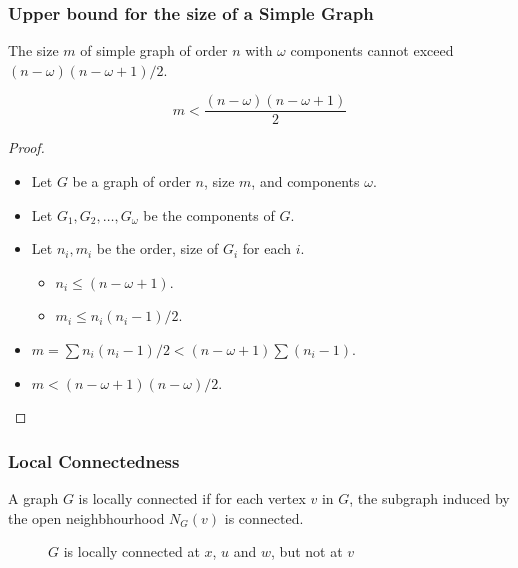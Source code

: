 \documentclass{beamer}
\begin{document}
\begin{frame}
\frametitle{Upper bound for the size of a Simple Graph}%
\begin{theorem}
	The size $m$ of simple graph of order $n$ with $\omega$ components cannot exceed $(n-\omega)(n-\omega+1)/2$.
\end{theorem}
	$$ m < \frac{(n-\omega)(n-\omega+1)}{2}$$
\begin{proof}
\begin{itemize}
	\item Let $G$ be a graph of order $n$, size $m$, and components $\omega$.
	\item Let $G_1,G_2,\dots,G_\omega$ be the components of $G$.
	\item Let $n_i,m_i$ be the order, size of $G_i$ for each $i$.
	\begin{itemize}
		\item $n_i \le (n-\omega+1)$.
		\item $m_i \le n_i(n_i-1)/2$.
	\end{itemize}
	\item $m = \sum n_i(n_i-1)/2 < (n-\omega+1) \sum (n_i - 1)$.
	\item $m < (n-\omega+1)(n-\omega)/2$.
\end{itemize}
\end{proof}
\end{frame}

\begin{frame}
\frametitle{Local Connectedness}%
\begin{definition}
	A graph $G$ is locally connected if for each vertex $v$ in $G$, the subgraph induced by the open neighbhourhood $N_G(v)$ is connected.
\end{definition}

\begin{figure}
\centering
{}
\hspace{2cm}
	\caption{$G$ is locally connected at $x$, $u$ and $w$, but not at $v$}
\end{figure}

\end{frame}
\end{document}

